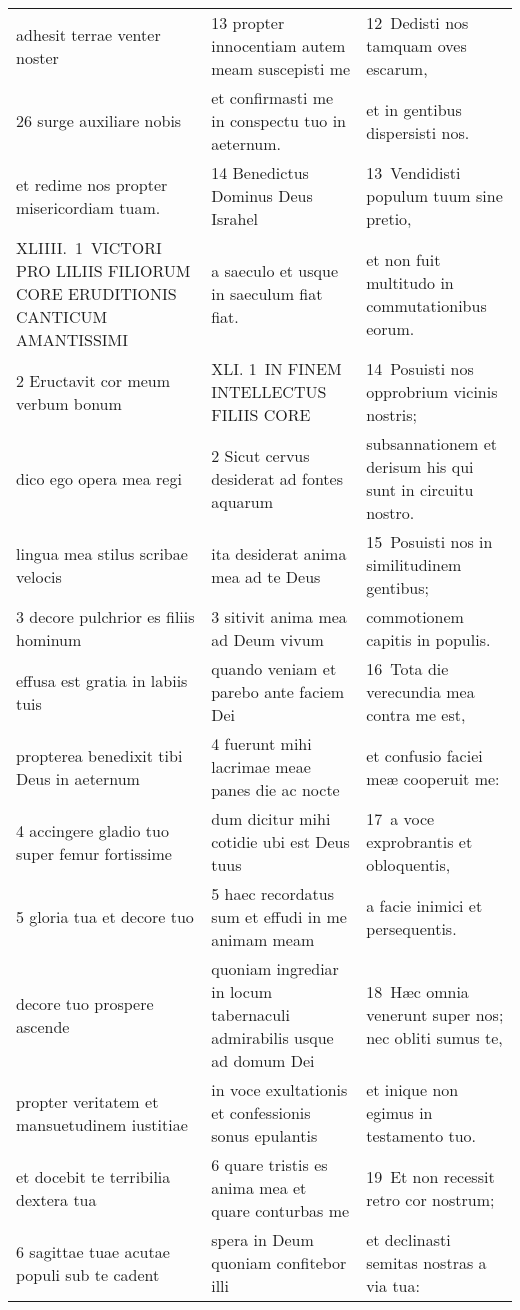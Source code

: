 \documentclass{article}
\begin{document}
\begin{longtable}{@{}p{}p{}p{}@{}}
adhesit terrae venter noster	&	13 propter innocentiam autem meam suscepisti me	&	12 Dedisti nos tamquam oves escarum,	\\
26 surge auxiliare nobis	&	et confirmasti me in conspectu tuo in aeternum.	&	et in gentibus dispersisti nos.	\\
et redime nos propter misericordiam tuam.	&	14 Benedictus Dominus Deus Israhel	&	13 Vendidisti populum tuum sine pretio,	\\
XLIIII. 1 VICTORI PRO LILIIS FILIORUM CORE ERUDITIONIS CANTICUM AMANTISSIMI	&	a saeculo et usque in saeculum fiat fiat.	&	et non fuit multitudo in commutationibus eorum.	\\
2 Eructavit cor meum verbum bonum	&	XLI. 1 IN FINEM INTELLECTUS FILIIS CORE	&	14 Posuisti nos opprobrium vicinis nostris;	\\
dico ego opera mea regi	&	2 Sicut cervus desiderat ad fontes aquarum	&	subsannationem et derisum his qui sunt in circuitu nostro.	\\
lingua mea stilus scribae velocis	&	ita desiderat anima mea ad te Deus	&	15 Posuisti nos in similitudinem gentibus;	\\
3 decore pulchrior es filiis hominum	&	3 sitivit anima mea ad Deum vivum	&	commotionem capitis in populis.	\\
effusa est gratia in labiis tuis	&	quando veniam et parebo ante faciem Dei	&	16 Tota die verecundia mea contra me est,	\\
propterea benedixit tibi Deus in aeternum	&	4 fuerunt mihi lacrimae meae panes die ac nocte	&	et confusio faciei meæ cooperuit me:	\\
4 accingere gladio tuo super femur fortissime	&	dum dicitur mihi cotidie ubi est Deus tuus	&	17 a voce exprobrantis et obloquentis,	\\
5 gloria tua et decore tuo	&	5 haec recordatus sum et effudi in me animam meam	&	a facie inimici et persequentis.	\\
decore tuo prospere ascende	&	quoniam ingrediar in locum tabernaculi admirabilis usque ad domum Dei	&	18 Hæc omnia venerunt super nos; nec obliti sumus te,	\\
propter veritatem et mansuetudinem iustitiae	&	in voce exultationis et confessionis sonus epulantis	&	et inique non egimus in testamento tuo.	\\
et docebit te terribilia dextera tua	&	6 quare tristis es anima mea et quare conturbas me	&	19 Et non recessit retro cor nostrum;	\\
6 sagittae tuae acutae populi sub te cadent	&	spera in Deum quoniam confitebor illi	&	et declinasti semitas nostras a via tua:	\\

\end{longtable}
\end{document}
